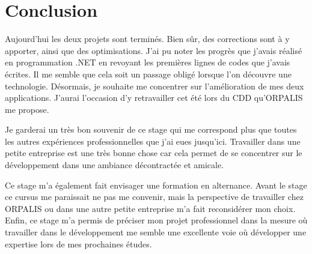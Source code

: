 \chapter*{Conclusion}

Aujourd'hui les deux projets sont terminés. Bien sûr, des corrections sont à y apporter, ainsi que des optimisations. J'ai pu noter les progrès que j'avais réalisé en programmation .NET en revoyant les premières lignes de codes que j'avais écrites. Il me semble que cela soit un passage obligé lorsque l'on découvre une technologie. Désormais, je souhaite me concentrer sur l'amélioration de mes deux applications. J'aurai l'occasion d'y retravailler cet été lors du CDD qu'ORPALIS me propose.

Je garderai un très bon souvenir de ce stage qui me correspond plus que toutes les autres expériences professionnelles que j'ai eues jusqu'ici. Travailler dans une petite entreprise est une très bonne chose car cela permet de se concentrer sur le développement dans une ambiance décontractée et amicale. 

Ce stage m'a également fait envisager une formation en alternance. Avant le stage ce cursus me paraissait ne pas me convenir, mais la perspective de travailler chez ORPALIS ou dans une autre petite entreprise m'a fait reconsidérer mon choix. Enfin, ce stage m'a permis de préciser mon projet professionnel dans la mesure où travailler dans le développement me semble une excellente voie où développer une expertise lors de mes prochaines études.